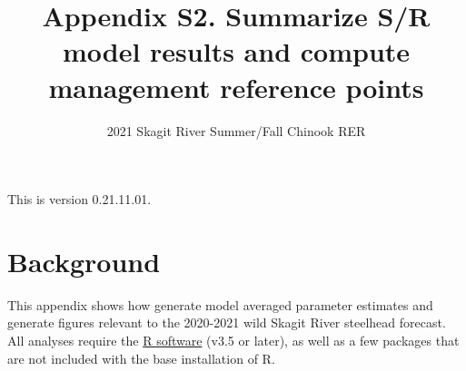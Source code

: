 \documentclass[
  11pt,
]{article}
\title{Appendix S2. Summarize S/R model results and compute management
reference points}
\subtitle{2021 Skagit River Summer/Fall Chinook RER}
\author{}
\date{\vspace{-2.5em}}
\begin{document}
\maketitle

{
\setcounter{tocdepth}{3}
\tableofcontents
}
\vspace{0.2in}

This is version 0.21.11.01.

\hypertarget{background}{%
\section{Background}\label{background}}

This appendix shows how generate model averaged parameter estimates and
generate figures relevant to the 2020-2021 wild Skagit River steelhead
forecast. All analyses require the \href{https://cran.r-project.org/}{R
software} (v3.5 or later), as well as a few packages that are not
included with the base installation of R.
\end{document}
